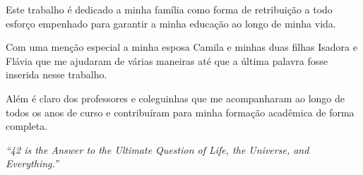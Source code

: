 
\imprimircapa

\imprimirfolhaderosto



\begin{agradecimentos}
Este trabalho é dedicado a minha família como forma de retribuição a todo esforço empenhado para garantir a minha educação ao longo de minha vida.

Com uma menção especial a minha esposa Camila e minhas duas filhas Isadora e Flávia que me ajudaram de várias maneiras até que a última palavra fosse inserida nesse trabalho.

Além é claro dos professores e coleguinhas que me acompanharam ao longo de todos os anos de curso e contribuíram para minha formação acadêmica de forma completa.

\end{agradecimentos}


\begin{comment}
Epígrafe (Não se escreve a palavra epígrafe). Elemento opcional. 
A epígrafe deve ser colocada após o agradecimento; trata-se de uma citação, seguida de indicação de autoria, relacionada à matéria tratada no corpo do trabalho. Deve ser “[...] elaborada conforme a NBR 10520 [...]. Podem também constar epígrafes nas folhas ou páginas de abertura das seções primárias” (ABNT, 2002, p. 7). 
A fonte da epígrafe deve sempre ser mencionada nas referências. 

Citação direta até 3 linhas deve estar entre aspas e em parágrafo normal (vá até a janela de Estilo - selecione - Parágrafo), se tiver mais de 3 linhas, deve ser recuada 4 cm da margem esquerda, com fonte menor que 12 e espaçamento entre linhas simples 
\end{comment}

\begin{epigrafe}
    \vspace*{\fill}
	\begin{flushright}
		\textit{“42 is the Answer to the Ultimate Question of Life, the Universe, and Everything.”  \\
}
	\end{flushright}
\end{epigrafe}

